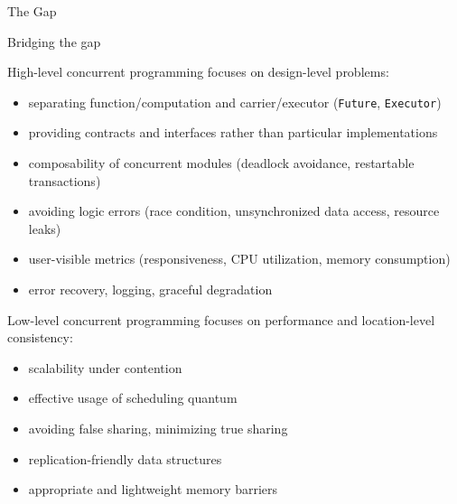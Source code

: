 \begin{frame}{The Gap}

\pause


\pause


\pause


\end{frame}

\begin{frame}{Bridging the gap}

High-level concurrent programming focuses on design-level problems:
\begin{itemize}
  \pause \item separating function/computation and carrier/executor (\texttt{Future}, \texttt{Executor})
  \pause \item providing contracts and interfaces rather than particular implementations
  \pause \item composability of concurrent modules (deadlock avoidance, restartable transactions)
  \pause \item avoiding logic errors (race condition, unsynchronized data access, resource leaks)
  \pause \item user-visible metrics (responsiveness, CPU utilization, memory consumption)
  \pause \item error recovery, logging, graceful degradation
\end{itemize}

\pause
Low-level concurrent programming focuses on performance and location-level consistency:
\begin{itemize}
  \pause \item scalability under contention
  \pause \item effective usage of scheduling quantum 
  \pause \item avoiding false sharing, minimizing true sharing
  \pause \item replication-friendly data structures
  \pause \item appropriate and lightweight memory barriers  
\end{itemize}
\end{frame}


